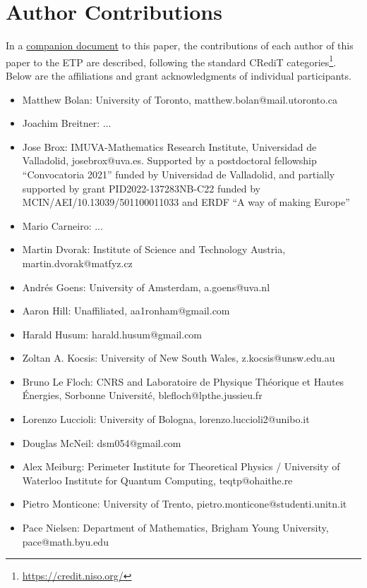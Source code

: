 \section{Author Contributions}

In a \href{https://github.com/teorth/equational_theories/blob/main/paper/contributions.md}{companion document} to this paper, the contributions of each author of this paper to the ETP are described, following the standard CRediT categories\footnote{\url{https://credit.niso.org/}}.  Below are the affiliations and grant acknowledgments of individual participants. 


\begin{itemize}
    \item Matthew Bolan: University of Toronto, matthew.bolan@mail.utoronto.ca
    \item Joachim Breitner: ...
    \item Jose Brox: IMUVA-Mathematics Research Institute, Universidad de Valladolid, josebrox@uva.es. Supported by a postdoctoral fellowship “Convocatoria 2021” funded by Universidad de Valladolid, and partially supported by grant PID2022-137283NB-C22 funded by MCIN/AEI/10.13039/501100011033 and ERDF “A way of making Europe”
    \item Mario Carneiro: ...
    \item Martin Dvorak: Institute of Science and Technology Austria, martin.dvorak@matfyz.cz
    \item Andr\'es Goens: University of Amsterdam, a.goens@uva.nl
    \item Aaron Hill: Unaffiliated, aa1ronham@gmail.com
    \item Harald Husum: harald.husum@gmail.com
    \item Zoltan A. Kocsis: University of New South Wales, z.kocsis@unsw.edu.au
    \item Bruno Le Floch: CNRS and Laboratoire de Physique Th\'eorique et Hautes \'Energies, Sorbonne Universit\'e, blefloch@lpthe.jussieu.fr
    \item Lorenzo Luccioli: University of Bologna, lorenzo.luccioli2@unibo.it
    \item Douglas McNeil: dsm054@gmail.com
    \item Alex Meiburg: Perimeter Institute for Theoretical Physics / University of Waterloo Institute for Quantum Computing, teqtp@ohaithe.re
    \item Pietro Monticone: University of Trento, pietro.monticone@studenti.unitn.it
    \item Pace Nielsen: Department of Mathematics, Brigham Young University, pace@math.byu.edu

\end{itemize}
